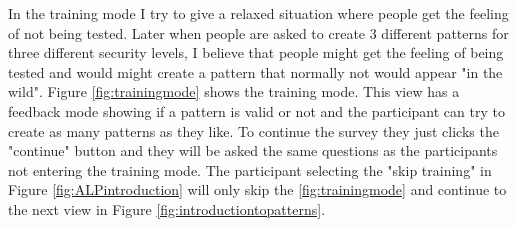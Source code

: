       In the training mode I try to give a relaxed situation where people get the feeling of not being tested. Later when people are asked to create 3 different patterns for three different security levels, I believe that people might get the feeling of being tested and would might create a pattern that normally not would appear "in the wild". Figure \ref{fig:trainingmode} shows the training mode. This view has a feedback mode showing if a pattern is valid or not and the participant can try to create as many patterns as they like. To continue the survey they just clicks the "continue" button and they will be asked the same questions as the participants not entering the training mode. The participant selecting the "skip training" in Figure \ref{fig:ALPintroduction} will only skip the \ref{fig:trainingmode} and continue to the next view in Figure \ref{fig:introductiontopatterns}.


